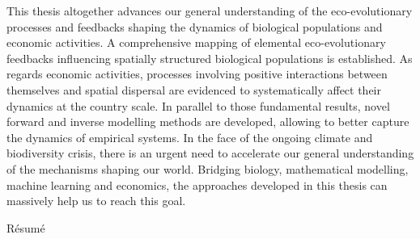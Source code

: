 {    This thesis altogether advances our general understanding of the eco-evolutionary processes and feedbacks shaping the dynamics of biological populations and economic activities. A comprehensive mapping of elemental eco-evolutionary feedbacks influencing spatially structured biological populations is established. As regards economic activities, processes involving positive interactions between themselves and spatial dispersal are evidenced to systematically affect their dynamics at the country scale. In parallel to those fundamental results, novel forward and inverse modelling methods are developed, allowing to better capture the dynamics of empirical systems. In the face of the ongoing climate and biodiversity crisis, there is an urgent need to accelerate our general understanding of the mechanisms shaping our world. Bridging biology, mathematical modelling, machine learning and economics, the approaches developed in this thesis can massively help us to reach this goal.
}

\vspace*{20mm}

{Résumé}
\label{sec:summary-fr}
\vspace*{15mm}


